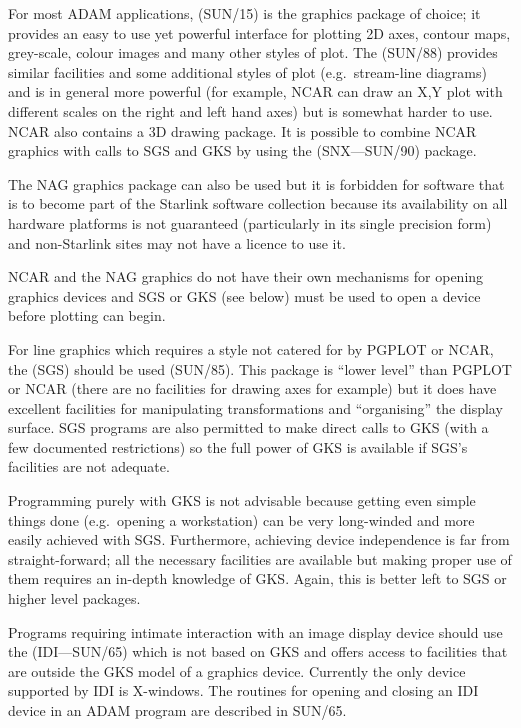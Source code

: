For most ADAM applications, 
 (SUN/15) is the graphics package of choice;
it provides an easy to use yet powerful interface for plotting 2D axes, contour 
maps, grey-scale, colour images and many other styles of plot. The 
(SUN/88) provides similar facilities and some additional styles of plot
(e.g.\ stream-line diagrams) and is in general more powerful (for example, NCAR
can draw an X,Y plot with different scales on the right and left hand axes) but
is somewhat harder to use. NCAR also contains a 3D drawing package. It
is possible to combine NCAR graphics with calls to SGS and GKS by using
the  (SNX---SUN/90) package.

The NAG graphics package can also be used but it is forbidden for 
software that is to become part of the Starlink software collection because 
its availability on all hardware platforms is not guaranteed
(particularly in its single precision form) and non-Starlink sites may
not have a licence to use it.

NCAR and the NAG graphics do not have their own mechanisms for opening graphics
devices and SGS or GKS (see below) must be used to open a device before
plotting can begin.

For line graphics which requires a style not catered for by PGPLOT or NCAR, the
(SGS) should be used (SUN/85). This package is ``lower
level'' than PGPLOT or NCAR (there are no facilities for drawing axes for
example) but it does have excellent facilities for manipulating transformations
and ``organising'' the display surface. SGS programs are also permitted to make
direct calls to GKS (with a few documented restrictions) so the full power of
GKS is available if SGS's facilities are not adequate.

Programming purely with GKS is not advisable because getting even simple things
done (e.g.\ opening a workstation) can be very long-winded and more easily
achieved with SGS. Furthermore, achieving device independence is far from
straight-forward; all the necessary facilities are available but making proper
use of them requires an in-depth knowledge of GKS. Again, this is better left
to SGS or higher level packages.

Programs requiring intimate interaction with an image display device should use
the 
(IDI---SUN/65) which is not based on GKS and offers
access to facilities that are outside the GKS model of a graphics device.
Currently the only device supported by IDI is 
X-windows. The routines for opening and closing an IDI device in an
ADAM program are described in SUN/65.


